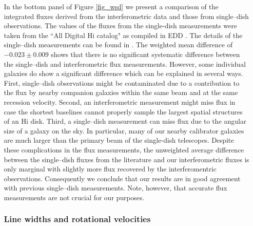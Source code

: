 \documentclass[usenatbib,useAMS]{mnras}
\begin{document}
In the bottom panel of Figure \ref{fig_wsd} we present a comparison
of the integrated fluxes derived from the interferometric data and those
from single--dish observations.  The values of the fluxes from the
single-dish measurements were taken from the ``All Digital H{\sc i}
catalog" \citep{ctf09} as compiled in EDD \citep{EDD}.  The details of
the single--dish measurements can be found in \citet{ksk04, shg05,
ctf09, ctf10, hgm11}.  The weighted mean difference of $-0.023 \pm
0.009$ shows that there is no significant systematic difference between
the single--dish and interferometric flux measurements.  However, some
individual galaxies do show a significant difference which can be
explained in several ways.  First, single--dish observations might be
contaminated due to a contribution to the flux by nearby companion
galaxies within the same beam and at the same recession velocity. 
Second, an interferometric measurement might miss flux in case the
shortest baselines cannot properly sample the largest spatial structures
of an H{\sc i} disk.  Third, a single--dish measurement can miss flux
due to the angular size of a galaxy on the sky.  In particular, many of
our nearby calibrator galaxies are much larger than the primary beam of
the single-dish telescopes. Despite these complications in the flux
measurements, the unweighted average difference between the single--dish
fluxes from the literature and our interferometric fluxes is only
marginal with slightly more flux recovered by the interferomentric
observations.  Consequently we conclude that our results are in good
agreement with previous single--dish measurements.  Note, however, that
accurate flux measurements are not crucial for our purposes. 

\subsubsection{Line widths and rotational velocities}
\end{document}
